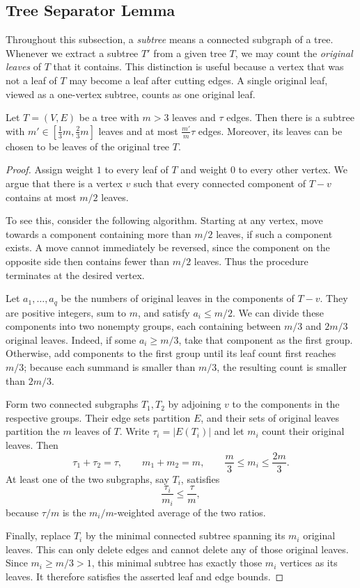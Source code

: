 \subsection{Tree Separator Lemma}
\label{subsection:separator}

Throughout this subsection, a \emph{subtree} means a connected subgraph
of a tree. Whenever we extract a subtree $T'$ from a given tree $T$,
we may count the \emph{original leaves} of $T$ that it contains.
This distinction is useful because a vertex that was not a leaf of $T$
may become a leaf after cutting edges. A single original leaf, viewed
as a one-vertex subtree, counts as one original leaf.

\begin{claim}
  \label{claim:tree_separator}
  Let $T=(V,E)$ be a tree with $m>3$ leaves and $\tau$ edges. Then
  there is a subtree with $m'\in[\frac13 m,\frac23 m]$ leaves and at most
  $\frac{m'}{m}\tau$ edges. Moreover, its leaves can be chosen to be
  leaves of the original tree $T$.
\end{claim}

\begin{proof}
  Assign weight $1$ to every leaf of $T$ and weight $0$ to every other
  vertex. We argue that there is a vertex $v$ such that every connected component of
  $T-v$ contains at most $m/2$ leaves. 

  To see this, consider the following algorithm. Starting at any vertex, move
  towards a component containing more than $m/2$ leaves, if such a
  component exists. A move cannot immediately be reversed, since the
  component on the opposite side then contains fewer than $m/2$ leaves.
  Thus the procedure terminates at the desired vertex.

  Let $a_1,\ldots,a_q$ be the numbers of original leaves in the
  components of $T-v$. They are positive integers, sum to $m$, and
  satisfy $a_i\le m/2$. We can divide these components into two
  nonempty groups, each containing between $m/3$ and $2m/3$ original
  leaves. Indeed, if some $a_i\ge m/3$, take that component as the
  first group. Otherwise, add components to the first group until its
  leaf count first reaches $m/3$; because each summand is smaller than
  $m/3$, the resulting count is smaller than $2m/3$.

  Form two connected subgraphs $T_1,T_2$ by adjoining $v$ to the
  components in the respective groups. Their edge sets partition
  $E$, and their sets of original leaves partition the $m$ leaves of
  $T$. Write $\tau_i=|E(T_i)|$ and let $m_i$ count their original
  leaves. Then
  \[
    \tau_1+\tau_2=\tau,\qquad m_1+m_2=m,
    \qquad \frac{m}{3}\le m_i\le\frac{2m}{3}.
  \]
  At least one of the two subgraphs, say $T_i$, satisfies
  \[
    \frac{\tau_i}{m_i}\le\frac{\tau}{m},
  \]
  because $\tau/m$ is the $m_i/m$-weighted average of the two ratios.

  Finally, replace $T_i$ by the minimal connected subtree spanning
  its $m_i$ original leaves. This can only delete edges and cannot
  delete any of those original leaves. Since $m_i\ge m/3>1$, this
  minimal subtree has exactly those $m_i$ vertices as its leaves.
  It therefore satisfies the asserted leaf and edge bounds.
\end{proof}


